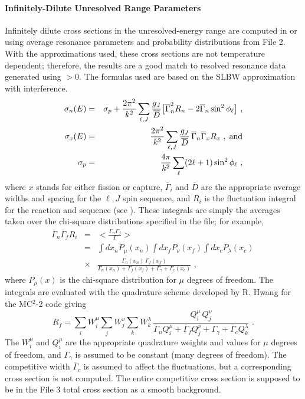 \paragraph{Infinitely-Dilute Unresolved Range Parameters}
Infinitely dilute cross sections in the unresolved-energy range
 are computed in
 or
 using average
resonance parameters and probability distributions from File 2.
With the approximations used, these cross sections are not
temperature dependent; therefore, the results are a good match to
resolved resonance data generated using $>$0.  The
formulas used are based on the SLBW
approximation with interference.
\begin{eqnarray}
  \sigma_n (E) &=& \sigma_p
    +{\frac{2\pi^2}{k^2}} \sum_{\ell,J}
    {\frac{g_J}{\overline D}} \bigl[
    \overline\Gamma_n^2 R_n
    -2\overline\Gamma_n\sin^2\phi_\ell \bigr]
    \,\,,\\
  \sigma_x(E)&=&{\frac{2\pi^2}{k^2}}
    \sum_{\ell,J} {\frac{g_J}{\overline D}}
    \,\overline\Gamma_n \overline\Gamma_x R_x
    \,\,,\;\hbox{and}\\
  \sigma_p&=&{\frac{4\pi}{k^2}} \sum_\ell
    (2\ell+1)\sin^2\phi_\ell
    \,\,,
\end{eqnarray}
where $x$ stands for either fission or capture, $\overline
\Gamma_i$ and $\overline D$ are the appropriate average widths
and spacing for the $\ell{,}J$ spin sequence, and $R_i$ is the
fluctuation integral for the reaction and sequence (see
).  These integrals are simply the averages taken
over the chi-square distributions
specified in the file; for example,
\begin{eqnarray}
  \overline\Gamma_n\overline\Gamma_f R_i&=&
    \biggl< {\frac{\Gamma_n\Gamma_f}{\Gamma}} \biggr>\nonumber\\
  &=&\int dx_n P_\mu (x_n) \int dx_f P_\nu (x_f)
    \int dx_c P_\lambda (x_c)\,\\
  &\times&{\frac{\Gamma_n (x_n) \,\Gamma_f (x_f)}
    {\Gamma_n (x_n) + \Gamma_f (x_f) + \Gamma_\gamma
    +\Gamma_c (x_c)}}\,\,,
\end{eqnarray}
where $P_\mu(x)$ is the chi-square distribution for $\mu$
degrees of freedom.  The integrals are evaluated with the
quadrature scheme developed by R. Hwang for the MC$^2$-2
code\cite{MC22} giving
\begin{equation}
  R_f=\sum_i W_i^\mu\sum_j W_j^\nu\sum_k W_k^\lambda
    \,{\frac{Q_i^\mu\,Q_j^\nu}
    {\overline\Gamma_n Q_i^\mu + \overline\Gamma_f Q_j^\nu
    +\Gamma_\gamma+\overline\Gamma_c Q_k^\lambda}} \,\,.
\end{equation}
The $W_i^\mu$ and $Q_i^\mu$ are the appropriate quadrature
weights and values for $\mu$ degrees of freedom, and
$\Gamma_\gamma$ is assumed to be constant (many degrees of
freedom).  The competitive width
$\overline\Gamma_c$ is assumed to affect the fluctuations,
but a corresponding cross section is not computed.  The
entire competitive cross section is supposed to be in the
File 3 total cross section as a smooth background.

